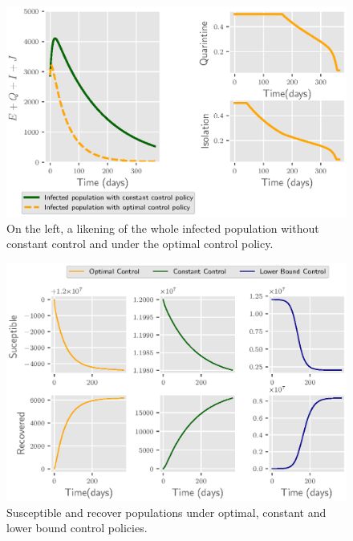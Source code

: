 \begin{figure}[t]
  \centering
  \includegraphics{Figures/figure_1_sars}
  \caption{On the left, a likening of the whole infected population
  without constant control and under the optimal control policy. }
  \label{fig:figure1sars}
\end{figure}

\begin{figure}[H]
  \centering
  \includegraphics{Figures/figure_2_sars}
  \caption{Susceptible and recover populations under
  optimal, constant and lower bound control policies.}
  \label{fig:figure2sars}
\end{figure}

